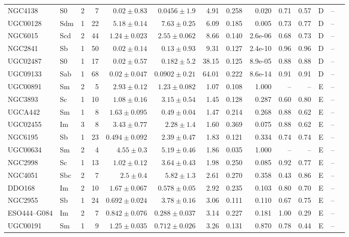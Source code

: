 \documentclass[9pt]{extarticle}
\begin{document}
{\begin{longtable}{lllrrrrrrrrcrl}
NGC4138 & S0 & 2 & 7 & $0.02\pm0.83$ & $0.0456\pm1.9$ & 4.91 & 0.258 & 0.020 & 0.71 & 0.57 & D & -- & \\
UGC00128 & Sdm & 1 & 22 & $5.18\pm0.14$ & $7.63\pm0.25$ & 6.09 & 0.185 & 0.005 & 0.73 & 0.77 & D & -- & \\
NGC6015 & Scd & 2 & 44 & $1.24\pm0.023$ & $2.55\pm0.062$ & 8.66 & 0.140 & 2.6e-06 & 0.68 & 0.73 & D & -- & \\
NGC2841 & Sb & 1 & 50 & $0.02\pm0.14$ & $0.13\pm0.93$ & 9.31 & 0.127 & 2.4e-10 & 0.96 & 0.96 & D & -- & \\
UGC02487 & S0 & 1 & 17 & $0.02\pm0.57$ & $0.182\pm5.2$ & 38.15 & 0.125 & 8.9e-05 & 0.88 & 0.88 & D & -- & \\
UGC09133 & Sab & 1 & 68 & $0.02\pm0.047$ & $0.0902\pm0.21$ & 64.01 & 0.222 & 8.6e-14 & 0.91 & 0.91 & D & -- & \\
\midrule
UGC00891 & Sm & 2 & 5 & $2.93\pm0.12$ & $1.23\pm0.082$ & 1.07 & 0.108 & 1.000 & -- & -- & E & -- & \\
NGC3893 & Sc & 1 & 10 & $1.08\pm0.16$ & $3.15\pm0.54$ & 1.45 & 0.128 & 0.287 & 0.60 & 0.80 & E & -- & \\
UGCA442 & Sm & 1 & 8 & $1.63\pm0.095$ & $0.49\pm0.04$ & 1.47 & 0.214 & 0.268 & 0.88 & 0.62 & E & -- & \\
UGC02455 & Im & 3 & 8 & $3.43\pm0.77$ & $2.28\pm1.4$ & 1.60 & 0.369 & 0.075 & 0.88 & 0.62 & E & -- & \\
NGC6195 & Sb & 1 & 23 & $0.494\pm0.092$ & $2.39\pm0.47$ & 1.83 & 0.121 & 0.334 & 0.74 & 0.74 & E & -- & \\
UGC00634 & Sm & 2 & 4 & $4.55\pm0.3$ & $5.19\pm0.46$ & 1.86 & 0.035 & 1.000 & -- & -- & E & -- & \\
NGC2998 & Sc & 1 & 13 & $1.02\pm0.12$ & $3.64\pm0.43$ & 1.98 & 0.250 & 0.085 & 0.92 & 0.77 & E & -- & \\
NGC4051 & Sbc & 2 & 7 & $2.5\pm0.4$ & $5.82\pm1.3$ & 2.61 & 0.270 & 0.358 & 0.43 & 0.86 & E & -- & \\
DDO168 & Im & 2 & 10 & $1.67\pm0.067$ & $0.578\pm0.05$ & 2.92 & 0.235 & 0.103 & 0.80 & 0.70 & E & -- & \\
NGC2955 & Sb & 1 & 24 & $0.692\pm0.024$ & $3.78\pm0.16$ & 3.06 & 0.111 & 0.110 & 0.67 & 0.75 & E & -- & \\
ESO444--G084 & Im & 2 & 7 & $0.842\pm0.076$ & $0.288\pm0.037$ & 3.14 & 0.227 & 0.181 & 1.00 & 0.29 & E & -- & \\
UGC00191 & Sm & 1 & 9 & $1.25\pm0.035$ & $0.712\pm0.026$ & 3.26 & 0.131 & 0.870 & 0.78 & 0.44 & E & -- & \\

\end{longtable}}
\end{document}
